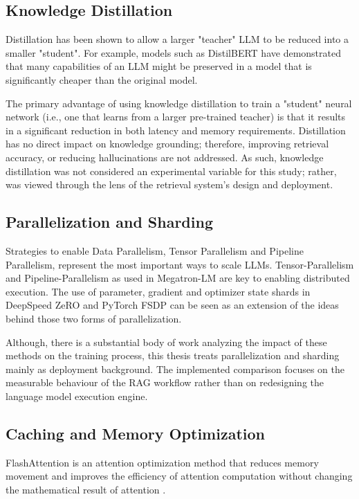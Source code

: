 \subsection{Knowledge Distillation}

Distillation has been shown to allow a larger "teacher" \ac{LLM} to be reduced into a smaller "student". For example, models such as DistilBERT \cite{sanh2019distilbert} have demonstrated that many capabilities of an \ac{LLM} might be preserved in a model that is significantly cheaper than the original model. 

The primary advantage of using knowledge distillation to train a "student" neural network (i.e., one that learns from a larger pre-trained teacher) is that it results in a significant reduction in both latency and memory requirements. Distillation has no direct impact on knowledge grounding; therefore, improving retrieval accuracy, or reducing hallucinations are not addressed. As such, knowledge distillation was not considered an experimental variable for this study; rather, was viewed through the lens of the retrieval system's design and deployment.

\subsection{Parallelization and Sharding}

Strategies to enable Data Parallelism, Tensor Parallelism and Pipeline Parallelism, represent the most important ways to scale LLMs. Tensor-Parallelism and Pipeline-Parallelism as used in Megatron-LM \cite{shoeybi2019megatron} are key to enabling distributed execution. The use of parameter, gradient and optimizer state shards in DeepSpeed ZeRO \cite{rajbhandari2020deepspeed} and PyTorch \ac{FSDP} can be seen as an extension of the ideas behind those two forms of parallelization. 

Although, there is a substantial body of work analyzing the impact of these methods on the training process, this thesis treats parallelization and sharding mainly as deployment background. The implemented comparison focuses on the measurable behaviour of the \ac{RAG} workflow rather than on redesigning the language model execution engine.

\subsection{Caching and Memory Optimization}

FlashAttention is an attention optimization method that reduces memory movement and improves the efficiency of attention computation without changing the mathematical result of attention \cite{dao2022flashattention}.


